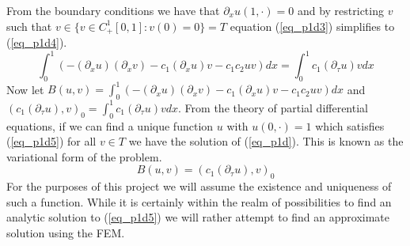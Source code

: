\documentclass[11pt,fleqn]{article}
\theoremstyle{defstyle}
\begin{document}
From the boundary conditions we have that $\partial_xu(1,\cdot)=0$ and by restricting $v$ such that $v \in \{v \in C^1_+[0, 1] : v(0)=0 \} = T$ equation (\ref{eq_p1d3}) simplifies to (\ref{eq_p1d4}).
\begin{equation}
\int_0^1 (-(\partial_xu)(\partial_xv) - c_1(\partial_xu)v - c_1c_2uv)dx = \int^1_0 c_1(\partial_{\tau}u)v dx
\label{eq_p1d4}
\end{equation}
Now let $B(u, v) = \int_0^1 (-(\partial_xu)(\partial_xv) - c_1(\partial_xu)v - c_1c_2uv)dx$ and $(c_1(\partial_{\tau}u),v)_0 = \int^1_0 c_1(\partial_{\tau}u)v dx$. From the theory of partial differential equations, if we can find a unique function $u$ with $u(0, \cdot)=1$ which satisfies (\ref{eq_p1d5}) for all $v \in T$ we have the solution of (\ref{eq_p1d}). This is known as the variational form of the problem. 
\begin{equation}
B(u, v) = (c_1(\partial_{\tau}u),v)_0
\label{eq_p1d5}
\end{equation}
For the purposes of this project we will assume the existence and uniqueness of such a function. While it is certainly within the realm of possibilities to find an analytic solution to (\ref{eq_p1d5}) we will rather attempt to find an approximate solution using the FEM.
\end{document}
